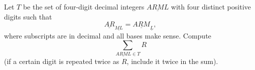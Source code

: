 Let $T$ be the set of four-digit decimal integers $\underline{ARML}$ with four distinct positive digits such that \[\underline{AR}_{\underline{ML}}=\underline{ARM}_{\underline{L}},\] where subscripts are in decimal and all bases make sense. Compute \[\displaystyle\sum_{\underline{ARML}\in T}R\] (if a certain digit is repeated twice as $R$, include it twice in the sum).